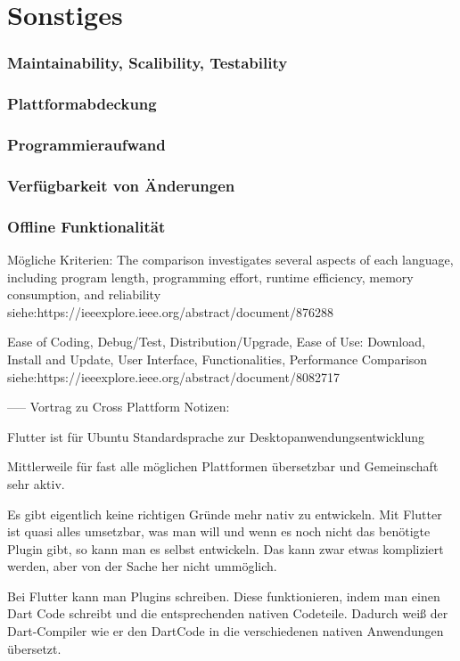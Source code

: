 \section{Sonstiges}
\subsubsection{Maintainability, Scalibility, Testability}
\subsubsection{Plattformabdeckung}
\subsubsection{Programmieraufwand}
\subsubsection{Verfügbarkeit  von Änderungen}
\subsubsection{Offline Funktionalität}




Mögliche Kriterien:
The comparison investigates several aspects of each language, including program length, programming effort, runtime efficiency, memory consumption, and reliability
siehe:https://ieeexplore.ieee.org/abstract/document/876288

Ease of Coding, Debug/Test, Distribution/Upgrade, Ease of Use: Download, Install and Update, User Interface, Functionalities, Performance Comparison 
siehe:https://ieeexplore.ieee.org/abstract/document/8082717

-----
Vortrag zu Cross Plattform Notizen:

Flutter ist für Ubuntu Standardsprache zur Desktopanwendungsentwicklung

Mittlerweile für fast alle möglichen Plattformen übersetzbar und Gemeinschaft sehr aktiv.

Es gibt eigentlich keine richtigen Gründe mehr nativ zu entwickeln. Mit Flutter ist quasi alles umsetzbar, was man will und wenn es noch nicht das benötigte Plugin gibt, so kann man es selbst entwickeln. Das kann zwar etwas kompliziert werden, aber von der Sache her nicht ummöglich.

Bei Flutter kann man Plugins schreiben. Diese funktionieren, indem man einen Dart Code schreibt und die entsprechenden nativen Codeteile. Dadurch weiß der Dart-Compiler wie er den DartCode in die verschiedenen nativen Anwendungen übersetzt.

